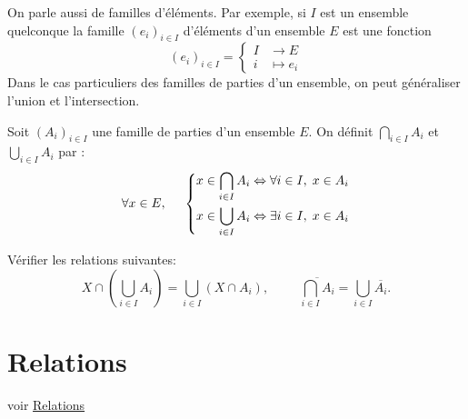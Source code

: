 On parle aussi de familles d'éléments. Par exemple, si $I$ est un ensemble quelconque la famille $(e_i)_{i\in I}$ d'éléments d'un ensemble $E$ est une fonction
\begin{displaymath}
  (e_i)_{i\in I} = 
  \left\lbrace 
  \begin{aligned}
    I &\rightarrow E \\ i &\mapsto e_i
  \end{aligned}
\right.   
\end{displaymath}
Dans le cas particuliers des familles de parties d'un ensemble, on peut généraliser l'union et l'intersection.
\begin{defi}
  Soit $(A_i)_{i\in I}$ une famille de parties d'un ensemble $E$. On définit $\bigcap_{i\in I}A_i$ et $\bigcup_{i\in I}A_i$ par :
\begin{displaymath}
  \forall x \in E,\hspace{0.5cm}
  \left\lbrace 
  \begin{aligned}
    x\in \bigcap_{i\in I}A_i &\Leftrightarrow \forall i \in I,\; x\in A_i \\
    x\in \bigcup_{i\in I}A_i &\Leftrightarrow \exists i \in I,\; x\in A_i 
  \end{aligned}
\right. 
\end{displaymath}
\end{defi}
Vérifier les relations suivantes:
\[
 X \cap \left( \bigcup_{i\in I}A_i\right) = \bigcup_{i\in I}(X \cap A_i), \hspace{1cm}
 \overline{\bigcap_{i \in I} A_i} = \bigcup_{i \in I} \overline{A_i}.
\]


\section{Relations}
voir \href{\baseurl C3548.pdf}{Relations}
